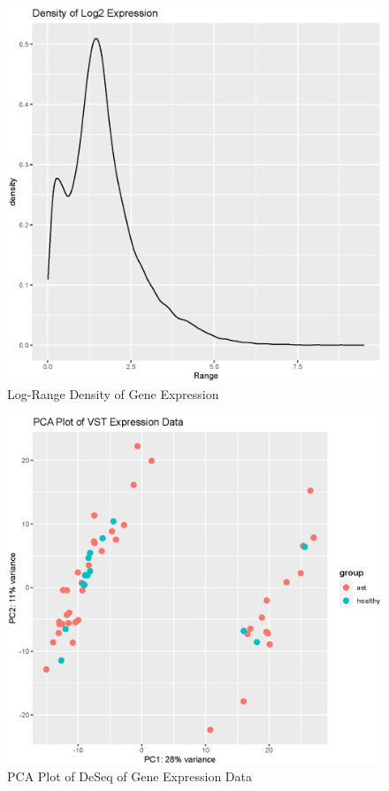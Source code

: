 \documentclass[pdflatex,sn-mathphys]{sn-jnl}%
\theoremstyle{thmstyleone}%
\theoremstyle{thmstyletwo}%
\theoremstyle{thmstylethree}%
\begin{document}
\begin{figure}[h!]
    \centering
    \includegraphics[scale=0.4]{plots/assn2/density_plot.eps}
    \caption{Log-Range Density of Gene Expression}
    \label{fig:density}
\end{figure}
\begin{figure}[h!]
    \centering
    \includegraphics[scale=0.5]{plots/assn2/pca_plot.eps}
    \caption{PCA Plot of DeSeq of Gene Expression Data}
    \label{fig:pca}
\end{figure}
\end{document}
